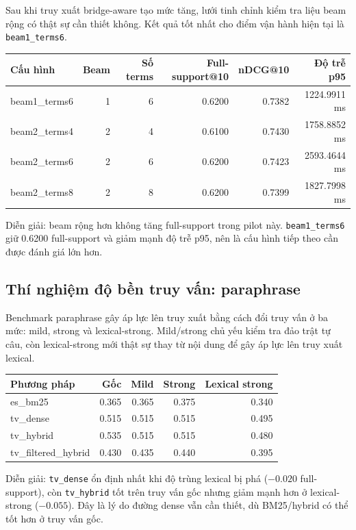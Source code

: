 \documentclass[11pt,a4paper]{article}
\newcommand{\method}[1]{\texttt{#1}}
\begin{document}
Sau khi truy xuất bridge-aware tạo mức tăng, lưới tinh chỉnh kiểm tra liệu beam rộng có thật sự cần thiết
không. Kết quả tốt nhất cho điểm vận hành hiện tại là \texttt{beam1\_terms6}.

\begin{tabularx}{\textwidth}{>{\ttfamily\raggedright\arraybackslash}p{} r r r r r}
\toprule
Cấu hình & Beam & Số terms & Full-support@10 & nDCG@10 & Độ trễ p95 \\
\midrule
beam1\_terms6 & 1 & 6 & 0.6200 & 0.7382 & 1224.9911 ms \\
beam2\_terms4 & 2 & 4 & 0.6100 & 0.7430 & 1758.8852 ms \\
beam2\_terms6 & 2 & 6 & 0.6200 & 0.7423 & 2593.4644 ms \\
beam2\_terms8 & 2 & 8 & 0.6200 & 0.7399 & 1827.7998 ms \\
\bottomrule
\end{tabularx}

Diễn giải: beam rộng hơn không tăng full-support trong pilot này. \texttt{beam1\_terms6}
giữ 0.6200 full-support và giảm mạnh độ trễ p95, nên là cấu hình tiếp theo cần được đánh giá lớn hơn.

\subsection{Thí nghiệm độ bền truy vấn: paraphrase}

Benchmark paraphrase gây áp lực lên truy xuất bằng cách đổi truy vấn ở ba mức: mild, strong và lexical-strong.
Mild/strong chủ yếu kiểm tra đảo trật tự câu, còn lexical-strong mới thật sự thay từ nội dung để gây áp lực lên
truy xuất lexical.

\begin{tabularx}{\textwidth}{>{\ttfamily\raggedright\arraybackslash}p{} r r r r}
\toprule
Phương pháp & Gốc & Mild & Strong & Lexical strong \\
\midrule
es\_bm25 & 0.365 & 0.365 & 0.375 & 0.340 \\
tv\_dense & 0.515 & 0.515 & 0.515 & 0.495 \\
tv\_hybrid & 0.535 & 0.515 & 0.515 & 0.480 \\
tv\_filtered\_hybrid & 0.430 & 0.435 & 0.440 & 0.395 \\
\bottomrule
\end{tabularx}

Diễn giải: \method{tv\_dense} ổn định nhất khi độ trùng lexical bị phá
($-0.020$ full-support), còn \method{tv\_hybrid} tốt trên truy vấn gốc nhưng giảm mạnh hơn ở
lexical-strong ($-0.055$). Đây là lý do đường dense vẫn cần thiết, dù BM25/hybrid có thể tốt hơn
ở truy vấn gốc.
\end{document}
